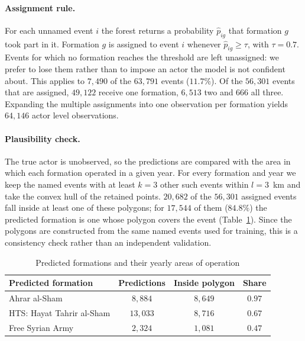 \paragraph{Assignment rule.}
For each unnamed event $i$ the forest returns a probability $\hat{p}_{ig}$ that
formation $g$ took part in it. Formation $g$ is assigned to event $i$ whenever
$\hat{p}_{ig}\geq\tau$, with $\tau=0.7$. Events for which no formation reaches
the threshold are left unassigned: we prefer to lose them rather than to impose
an actor the model is not confident about. This applies to $7{,}490$ of the
$63{,}791$ events ($11.7\%$). Of the $56{,}301$ events that are assigned,
$49{,}122$ receive one formation, $6{,}513$ two and $666$ all three. Expanding
the multiple assignments into one observation per formation yields $64{,}146$
actor level observations.

\paragraph{Plausibility check.}
The true actor is unobserved, so the predictions are compared with the area in
which each formation operated in a given year. For every formation and year we
keep the named events with at least $k=3$ other such events within $l=3$~km and
take the convex hull of the retained points. $20{,}682$ of the $56{,}301$ assigned
events fall inside at least one of these polygons; for $17{,}544$ of them
($84.8\%$) the predicted formation is one whose polygon covers the event
(Table~\ref{tab:rf_polygon}). Since the polygons are constructed from the same
named events used for training, this is a consistency check rather than an
independent validation.

\begin{table}[htbp]
\centering
\caption{Predicted formations and their yearly areas of operation}
\label{tab:rf_polygon}
\begin{tabular}{lccc}
\hline\hline
Predicted formation & Predictions & Inside polygon & Share \\
\hline
Ahrar al-Sham             & $8{,}884$  & $8{,}649$ & $0.97$ \\
HTS: Hayat Tahrir al-Sham & $13{,}033$ & $8{,}716$ & $0.67$ \\
Free Syrian Army          & $2{,}324$  & $1{,}081$ & $0.47$ \\
\hline\hline
\end{tabular}
\end{table}
